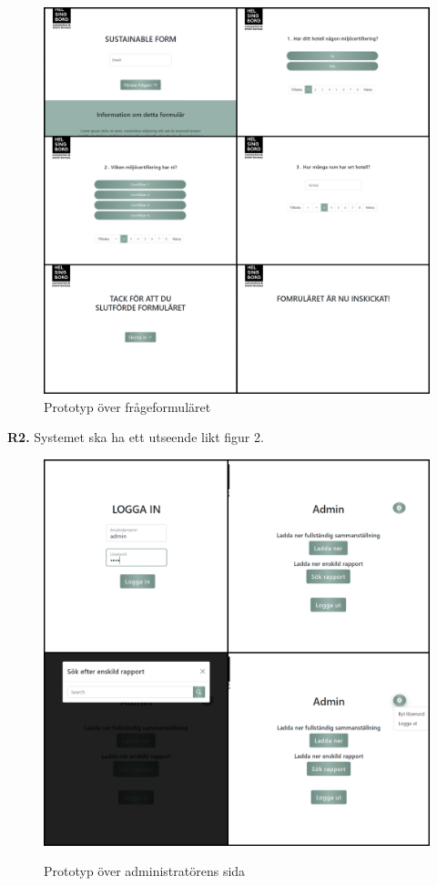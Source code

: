 \documentclass{article}
\begin{document}
    \begin{figure}[h!]
    \caption{Prototyp över frågeformuläret}
    \includegraphics[width=140mm]{Proto-Coll-Q (1).jpg}
    \end{figure}
    \newpage
    \large{\textbf{R2.}}
    Systemet ska ha ett utseende likt figur 2.
    \begin{figure}[h!]
        \centering
        \caption{Prototyp över administratörens sida}
        \includegraphics[width=140mm]{Proto-Coll-A.jpg}
        \label{fig:my_label}
    \end{figure}
\newpage
    
\end{document}

